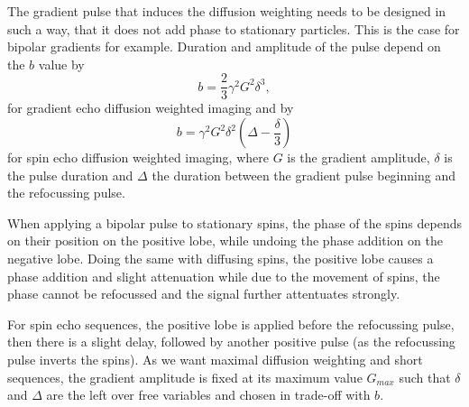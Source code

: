 \begin{table}[h]
 \noindent{}
 \caption{Diffusion coefficients for typical brain tissues~\autocite{sener_diffusion_2001, helenius_diffusion-weighted_2002}.}
 \label{diff-coef}
\end{table}

The gradient pulse that induces the diffusion weighting needs to be designed in such a way, that it does not add phase to stationary particles.
This is the case for bipolar gradients for example.
Duration and amplitude of the pulse depend on the $b$ value by
\[ b = \frac{2}{3} \gamma^2 G^2 \delta^3, \] for gradient echo diffusion weighted imaging and by
\[ b = \gamma^2 G^2 \delta^2 (\Delta - \frac{\delta}{3}) \]
for spin echo diffusion weighted imaging, where $G$ is the gradient amplitude, $\delta$ is the pulse duration and $\Delta$ the duration between the gradient pulse beginning and the refocussing pulse.

When applying a bipolar pulse to stationary spins, the phase of the spins depends on their position on the positive lobe, while undoing the phase addition on the negative lobe.
Doing the same with diffusing spins, the positive lobe causes a phase addition and slight attenuation while due to the movement of spins, the phase cannot be refocussed and the signal further attentuates strongly.

For spin echo sequences, the positive lobe is applied before the refocussing pulse, then there is a slight delay, followed by another positive pulse (as the refocussing pulse inverts the spins).
As we want maximal diffusion weighting and short sequences, the gradient amplitude is fixed at its maximum value $G_{max}$ such that $\delta$ and $\Delta$ are the left over free variables and chosen in trade-off with $b$.

